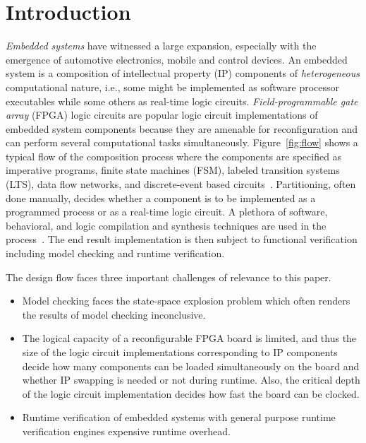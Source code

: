 \section{Introduction}
\label{sect-intro}

\begin{figure*}
\resizebox{1.9\columnwidth}{!}{
  
}
\caption{Embedded system specification, refinement, and implementation stages}
\label{fig:flow}
\end{figure*}

\emph{Embedded systems} have witnessed a large 
expansion, especially with  the emergence of automotive 
electronics, mobile and control devices.
%
An embedded system is a composition of intellectual property (IP) components
of \emph{heterogeneous} computational nature, i.e., some might be implemented as software 
processor executables while some others as real-time logic circuits. 
\emph{Field-programmable gate array} (FPGA) logic circuits are popular logic circuit 
implementations of embedded system components because they are amenable for reconfiguration and can perform several computational tasks simultaneously. 
%
Figure~\ref{fig:flow} shows a typical flow of the composition process where the
components are specified as imperative programs, finite state machines (FSM), labeled 
transition systems (LTS), data flow networks, and discrete-event based circuits~\cite{henzinger2006embedded}.
Partitioning, often done manually, decides whether a component is to 
be implemented as a programmed process or as a real-time logic circuit. 
A plethora of software, behavioral, and logic compilation and synthesis techniques are
used in the process~\cite{metropolis2}.
The end result implementation is then subject to functional verification including 
model checking and runtime verification. 

The design flow faces three important challenges of relevance to this paper. 

\begin{itemize}
\item Model checking faces the state-space explosion problem which often renders the results of model checking inconclusive. 
\item The logical capacity of a reconfigurable FPGA board is limited, and thus the size of the logic circuit implementations corresponding to IP components decide how many components can be loaded simultaneously on the board and whether IP swapping is needed or not during runtime. Also, the critical depth of the logic circuit implementation decides how fast the board can be clocked.
\item Runtime verification of embedded systems with general purpose runtime verification engines  expensive runtime overhead. 
\end{itemize}

